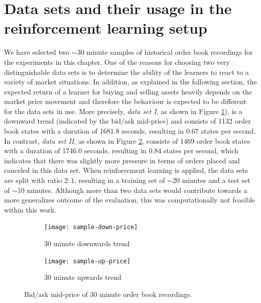 \section{Data sets and their usage in the reinforcement learning setup}
\label{sec:analysis-data-sets}
We have selected two $\sim$30 minute samples of historical order book recordings for the experiments in this chapter.
One of the reasons for choosing two very distinguishable data sets is to determine the ability of the learners to react to a variety of market situations.
In addition, as explained in the following section, the expected return of a learner for buying and selling assets heavily depends on the market price movement and therefore the behaviour is expected to be different for the data sets in use.
More precisely, \textit{data set I}, as shown in Figure \ref{fig:sample-down-price}), is a downward trend (indicated by the bid/ask mid-price) and consists of 1132 order book states with a duration of 1681.8 seconds, resulting in 0.67 states per second.
In contrast, \textit{data set II}, as shown in Figure \ref{fig:sample-up-price}, consists of 1469 order book states with a duration of 1746.0 seconds, resulting in 0.84 states per second, which indicates that there was slightly more pressure in terms of orders placed and canceled in this data set.
When reinforcement learning is applied, the data sets are split with ratio $2:1$, resulting in a training set of $\sim$20 minutes and a test set of $\sim$10 minutes.
Although more than two data sets would contribute towards a more generalizes outcome of the evaluation, this was computationally not feasible within this work.
\begin{figure}[H]
    \centering
    \begin{subfigure}[b]{0.45\textwidth}
        \texttt{[image: sample-down-price]}
        \caption{30 minute downwards trend}
        \label{fig:sample-down-price}
    \end{subfigure}
    \begin{subfigure}[b]{0.45\textwidth}
        \texttt{[image: sample-up-price]}
        \caption{30 minute upwards trend}
        \label{fig:sample-up-price}
    \end{subfigure}
    \caption{Bid/ask mid-price of 30 minute order book recordings.}
    \label{fig:sample-price}
\end{figure}

